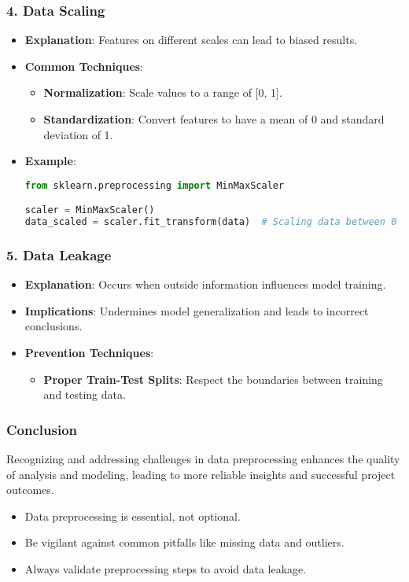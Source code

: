 \documentclass[aspectratio=169]{beamer}
\begin{document}
\begin{frame}
  \frametitle{4. Data Scaling}
  \begin{itemize}
    \item \textbf{Explanation}: Features on different scales can lead to biased results.
    \item \textbf{Common Techniques}:
      \begin{itemize}
        \item \textbf{Normalization}: Scale values to a range of [0, 1].
        \item \textbf{Standardization}: Convert features to have a mean of 0 and standard deviation of 1.
      \end{itemize}
    \item \textbf{Example}:
    \begin{lstlisting}[language=python]
from sklearn.preprocessing import MinMaxScaler

scaler = MinMaxScaler()
data_scaled = scaler.fit_transform(data)  # Scaling data between 0 and 1
    \end{lstlisting}
  \end{itemize}
\end{frame}

\begin{frame}
  \frametitle{5. Data Leakage}
  \begin{itemize}
    \item \textbf{Explanation}: Occurs when outside information influences model training.
    \item \textbf{Implications}: Undermines model generalization and leads to incorrect conclusions.
    \item \textbf{Prevention Techniques}:
      \begin{itemize}
        \item \textbf{Proper Train-Test Splits}: Respect the boundaries between training and testing data.
      \end{itemize}
  \end{itemize}
\end{frame}

\begin{frame}
  \frametitle{Conclusion}
  Recognizing and addressing challenges in data preprocessing enhances the quality of analysis and modeling, leading to more reliable insights and successful project outcomes.
  \begin{itemize}
    \item Data preprocessing is essential, not optional.
    \item Be vigilant against common pitfalls like missing data and outliers.
    \item Always validate preprocessing steps to avoid data leakage.
  \end{itemize}
\end{frame}
\end{document}
